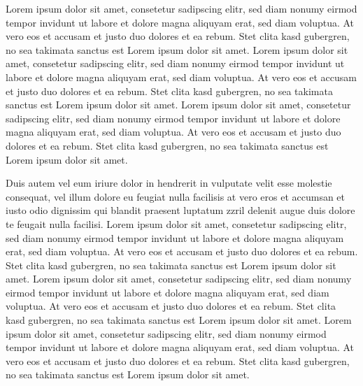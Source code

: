 


Lorem ipsum dolor sit amet, consetetur sadipscing elitr, sed diam nonumy eirmod tempor invidunt ut labore et dolore magna aliquyam erat, sed diam voluptua. At vero eos et accusam et justo duo dolores et ea rebum. Stet clita kasd gubergren, no sea takimata sanctus est Lorem ipsum dolor sit amet. Lorem ipsum dolor sit amet, consetetur sadipscing elitr, sed diam nonumy eirmod tempor invidunt ut labore et dolore magna aliquyam erat, sed diam voluptua. At vero eos et accusam et justo duo dolores et ea rebum. Stet clita kasd gubergren, no sea takimata sanctus est Lorem ipsum dolor sit amet. Lorem ipsum dolor sit amet, consetetur sadipscing elitr, sed diam nonumy eirmod tempor invidunt ut labore et dolore magna aliquyam erat, sed diam voluptua. At vero eos et accusam et justo duo dolores et ea rebum. Stet clita kasd gubergren, no sea takimata sanctus est Lorem ipsum dolor sit amet.   

Duis autem vel eum iriure dolor in hendrerit in vulputate velit esse molestie consequat, vel illum dolore eu feugiat nulla facilisis at vero eros et accumsan et iusto odio dignissim qui blandit praesent luptatum zzril delenit augue duis dolore te feugait nulla facilisi. Lorem ipsum dolor sit amet, consetetur sadipscing elitr, sed diam nonumy eirmod tempor invidunt ut labore et dolore magna aliquyam erat, sed diam voluptua. At vero eos et accusam et justo duo dolores et ea rebum. Stet clita kasd gubergren, no sea takimata sanctus est Lorem ipsum dolor sit amet. Lorem ipsum dolor sit amet, consetetur sadipscing elitr, sed diam nonumy eirmod tempor invidunt ut labore et dolore magna aliquyam erat, sed diam voluptua. At vero eos et accusam et justo duo dolores et ea rebum. Stet clita kasd gubergren, no sea takimata sanctus est Lorem ipsum dolor sit amet. Lorem ipsum dolor sit amet, consetetur sadipscing elitr, sed diam nonumy eirmod tempor invidunt ut labore et dolore magna aliquyam erat, sed diam voluptua. At vero eos et accusam et justo duo dolores et ea rebum. Stet clita kasd gubergren, no sea takimata sanctus est Lorem ipsum dolor sit amet.
